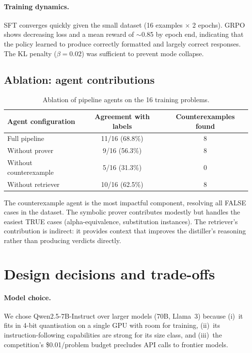 \documentclass{article}
\begin{document}
\paragraph{Training dynamics.} SFT converges quickly given the small dataset (16 examples $\times$ 2 epochs). GRPO shows decreasing loss and a mean reward of $\sim$0.85 by epoch end, indicating that the policy learned to produce correctly formatted and largely correct responses. The KL penalty ($\beta{=}0.02$) was sufficient to prevent mode collapse.

\subsection{Ablation: agent contributions}

\begin{table}[h]
  \caption{Ablation of pipeline agents on the 16 training problems.}
  \label{tab:ablation}
  \centering
  \begin{tabular}{lcc}
    \toprule
    Agent configuration & Agreement with labels & Counterexamples found \\
    \midrule
    Full pipeline & 11/16 (68.8\%) & 8 \\
    Without prover & 9/16 (56.3\%) & 8 \\
    Without counterexample & 5/16 (31.3\%) & 0 \\
    Without retriever & 10/16 (62.5\%) & 8 \\
    \bottomrule
  \end{tabular}
\end{table}

The counterexample agent is the most impactful component, resolving all FALSE cases in the dataset. The symbolic prover contributes modestly but handles the easiest TRUE cases (alpha-equivalence, substitution instances). The retriever's contribution is indirect: it provides context that improves the distiller's reasoning rather than producing verdicts directly.

\section{Design decisions and trade-offs}
\label{sec:tradeoffs}

\paragraph{Model choice.} We chose Qwen2.5-7B-Instruct over larger models (70B, Llama~3) because (i)~it fits in 4-bit quantisation on a single GPU with room for training, (ii)~its instruction-following capabilities are strong for its size class, and (iii)~the competition's \$0.01/problem budget precludes API calls to frontier models.
\end{document}
